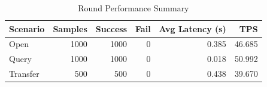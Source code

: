 \begin{table}
\caption{Round Performance Summary}
\label{tab:round_perf}
\begin{tabular}{lrrrrr}
\toprule
Scenario & Samples & Success & Fail & Avg Latency (s) & TPS \\
\midrule
Open & 1000 & 1000 & 0 & 0.385 & 46.685 \\
Query & 1000 & 1000 & 0 & 0.018 & 50.992 \\
Transfer & 500 & 500 & 0 & 0.438 & 39.670 \\
\bottomrule
\end{tabular}
\end{table}
